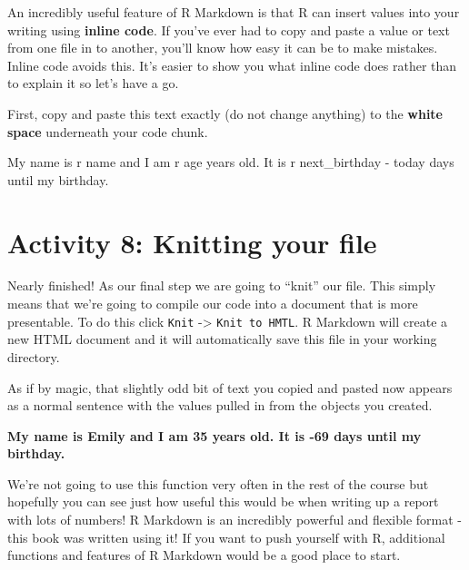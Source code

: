 \documentclass[
  oneside]{book}
\newenvironment{Shaded}{\begin{snugshade}}{\end{snugshade}}
\newcommand{\AttributeTok}[1]{\textcolor[rgb]{0.77,0.63,0.00}{#1}}
\newcommand{\NormalTok}[1]{#1}
\newcommand{\StringTok}[1]{\textcolor[rgb]{0.31,0.60,0.02}{#1}}
\begin{document}
An incredibly useful feature of R Markdown is that R can insert values into your writing using \textbf{inline code}. If you've ever had to copy and paste a value or text from one file in to another, you'll know how easy it can be to make mistakes. Inline code avoids this. It's easier to show you what inline code does rather than to explain it so let's have a go.

First, copy and paste this text exactly (do not change anything) to the \textbf{white space} underneath your code chunk.

\begin{Shaded}
\begin{Highlighting}[]
\NormalTok{My name is }\StringTok{\textasciigrave{}}\AttributeTok{r name}\StringTok{\textasciigrave{}}\NormalTok{ and I am }\StringTok{\textasciigrave{}}\AttributeTok{r age}\StringTok{\textasciigrave{}}\NormalTok{ years old. It is }\StringTok{\textasciigrave{}}\AttributeTok{r next\_birthday {-} today}\StringTok{\textasciigrave{}}\NormalTok{ days until my birthday.}
\end{Highlighting}
\end{Shaded}

\hypertarget{activity-8-knitting-your-file}{%
\section{Activity 8: Knitting your file}\label{activity-8-knitting-your-file}}

Nearly finished! As our final step we are going to ``knit'' our file. This simply means that we're going to compile our code into a document that is more presentable. To do this click \texttt{Knit} -\textgreater{} \texttt{Knit\ to\ HMTL}. R Markdown will create a new HTML document and it will automatically save this file in your working directory.

As if by magic, that slightly odd bit of text you copied and pasted now appears as a normal sentence with the values pulled in from the objects you created.

\textbf{My name is Emily and I am 35 years old. It is -69 days until my birthday.}

We're not going to use this function very often in the rest of the course but hopefully you can see just how useful this would be when writing up a report with lots of numbers! R Markdown is an incredibly powerful and flexible format - this book was written using it! If you want to push yourself with R, additional functions and features of R Markdown would be a good place to start.
\end{document}
